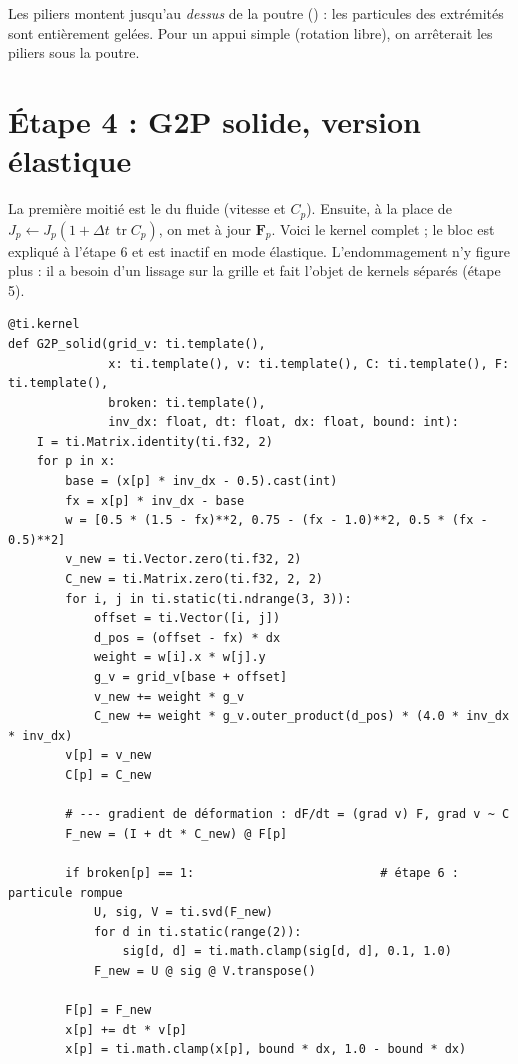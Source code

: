 \documentclass[11pt,a4paper]{article}
\newcommand{\code}[1]{\texttt{\detokenize{#1}}}
\newcommand{\tr}{\operatorname{tr}}
\begin{document}
Les piliers montent jusqu'au \emph{dessus} de la poutre (\code{pos.y <= beam_y1}) : les particules
des extrémités sont entièrement gelées. Pour un appui simple (rotation libre), on arrêterait les
piliers sous la poutre.

\section{Étape 4 : G2P solide, version élastique}

La première moitié est le \code{G2P} du fluide (vitesse et $C_p$). Ensuite, à la place de
$J_p \leftarrow J_p(1+\Delta t\,\tr C_p)$, on met à jour $\mathbf F_p$. Voici le kernel complet ;
le bloc \code{if broken} est expliqué à l'étape 6 et est inactif en mode élastique.
L'endommagement n'y figure plus : il a besoin d'un lissage sur la grille et fait l'objet de
kernels séparés (étape 5).

\begin{lstlisting}
@ti.kernel
def G2P_solid(grid_v: ti.template(),
              x: ti.template(), v: ti.template(), C: ti.template(), F: ti.template(),
              broken: ti.template(),
              inv_dx: float, dt: float, dx: float, bound: int):
    I = ti.Matrix.identity(ti.f32, 2)
    for p in x:
        base = (x[p] * inv_dx - 0.5).cast(int)
        fx = x[p] * inv_dx - base
        w = [0.5 * (1.5 - fx)**2, 0.75 - (fx - 1.0)**2, 0.5 * (fx - 0.5)**2]
        v_new = ti.Vector.zero(ti.f32, 2)
        C_new = ti.Matrix.zero(ti.f32, 2, 2)
        for i, j in ti.static(ti.ndrange(3, 3)):
            offset = ti.Vector([i, j])
            d_pos = (offset - fx) * dx
            weight = w[i].x * w[j].y
            g_v = grid_v[base + offset]
            v_new += weight * g_v
            C_new += weight * g_v.outer_product(d_pos) * (4.0 * inv_dx * inv_dx)
        v[p] = v_new
        C[p] = C_new

        # --- gradient de déformation : dF/dt = (grad v) F, grad v ~ C
        F_new = (I + dt * C_new) @ F[p]

        if broken[p] == 1:                          # étape 6 : particule rompue
            U, sig, V = ti.svd(F_new)
            for d in ti.static(range(2)):
                sig[d, d] = ti.math.clamp(sig[d, d], 0.1, 1.0)
            F_new = U @ sig @ V.transpose()

        F[p] = F_new
        x[p] += dt * v[p]
        x[p] = ti.math.clamp(x[p], bound * dx, 1.0 - bound * dx)
\end{lstlisting}
\end{document}

